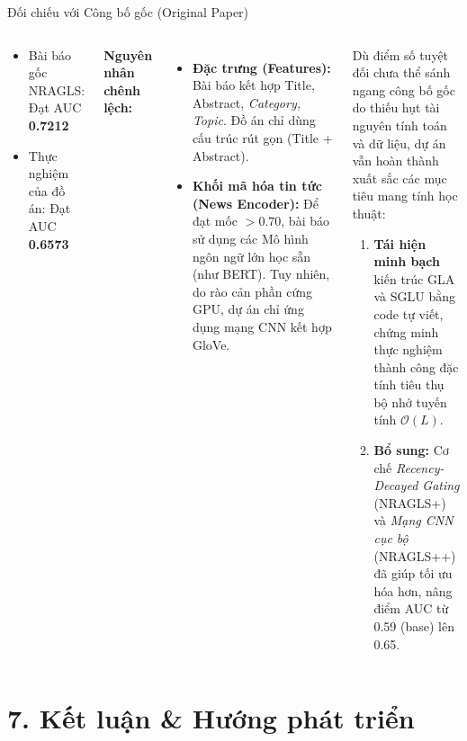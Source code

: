 \documentclass[aspectratio=169,11pt]{beamer}
\newcommand{\hl}[1]{\textcolor{accentorange}{\textbf{#1}}}
\newcommand{\faCheckCircle}{$\checkmark$}
\begin{document}
\begin{frame}{Đối chiếu với Công bố gốc (Original Paper)}
\scriptsize
  \begin{columns}[T]
      \begin{warnbox}[title={Khoảng cách hiệu năng}]
        \begin{itemize}
          \item Bài báo gốc NRAGLS: Đạt AUC \textbf{0.7212}
          \item Thực nghiệm của đồ án: Đạt AUC \hl{0.6573}
        \end{itemize}
      \end{warnbox}
      \vspace{0.4em}
      \textbf{Nguyên nhân chênh lệch:}
      \begin{itemize}
        \item \textbf{Đặc trưng (Features):} Bài báo kết hợp Title, Abstract, \textit{Category, Topic}. Đồ án chỉ dùng cấu trúc rút gọn (Title + Abstract).
        \item \textbf{Khối mã hóa tin tức (News Encoder):} Để đạt mốc $>0.70$, bài báo sử dụng các Mô hình ngôn ngữ lớn học sẵn (như BERT). Tuy nhiên, do rào cản phần cứng GPU, dự án chỉ ứng dụng mạng CNN kết hợp GloVe.
      \end{itemize}

      \begin{goodbox}[title={\faCheckCircle\ Thành công cốt lõi của đồ án}]
        Dù điểm số tuyệt đối chưa thể sánh ngang công bố gốc do thiếu hụt tài nguyên tính toán và dữ liệu, dự án vẫn hoàn thành xuất sắc các mục tiêu mang tính học thuật:
        \begin{enumerate}
          \item \textbf{Tái hiện minh bạch} kiến trúc GLA và SGLU bằng code tự viết, chứng minh thực nghiệm thành công đặc tính tiêu thụ bộ nhớ tuyến tính $\mathcal{O}(L)$.
          \item \textbf{Bổ sung:} Cơ chế \textit{Recency-Decayed Gating} (NRAGLS+) và \textit{Mạng CNN cục bộ} (NRAGLS++) đã giúp tối ưu hóa hơn, nâng điểm AUC từ 0.59 (base) lên 0.65.
        \end{enumerate}
      \end{goodbox}
  \end{columns}
\end{frame}
\section{7. Kết luận \& Hướng phát triển}
\end{document}
